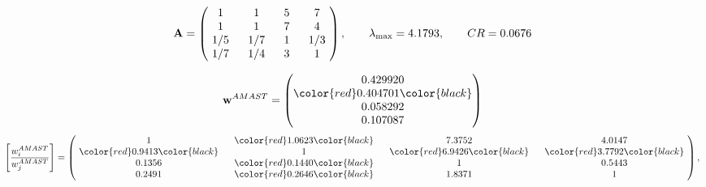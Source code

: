 \begin{example}
\begin{equation*}
\mathbf{A} =
\begin{pmatrix}
$\,\,$ 1 $\,\,$ & $\,\,$1$\,\,$ & $\,\,$5$\,\,$ & $\,\,$7 $\,\,$ \\
$\,\,$ 1 $\,\,$ & $\,\,$ 1 $\,\,$ & $\,\,$7$\,\,$ & $\,\,$4 $\,\,$ \\
$\,\,$ 1/5$\,\,$ & $\,\,$ 1/7$\,\,$ & $\,\,$ 1 $\,\,$ & $\,\,$ 1/3 $\,\,$ \\
$\,\,$ 1/7$\,\,$ & $\,\,$ 1/4$\,\,$ & $\,\,$3$\,\,$ & $\,\,$ 1  $\,\,$ \\
\end{pmatrix},
\qquad
\lambda_{\max} =
4.1793,
\qquad
CR = 0.0676
\end{equation*}

\begin{equation*}
\mathbf{w}^{AMAST} =
\begin{pmatrix}
0.429920\\
\color{red} 0.404701\color{black} \\
0.058292\\
0.107087
\end{pmatrix}\end{equation*}
\begin{equation*}
\left[ \frac{{w}^{AMAST}_i}{{w}^{AMAST}_j} \right] =
\begin{pmatrix}
$\,\,$ 1 $\,\,$ & $\,\,$\color{red} 1.0623\color{black} $\,\,$ & $\,\,$7.3752$\,\,$ & $\,\,$4.0147$\,\,$ \\
$\,\,$\color{red} 0.9413\color{black} $\,\,$ & $\,\,$ 1 $\,\,$ & $\,\,$\color{red} 6.9426\color{black} $\,\,$ & $\,\,$\color{red} 3.7792\color{black}   $\,\,$ \\
$\,\,$0.1356$\,\,$ & $\,\,$\color{red} 0.1440\color{black} $\,\,$ & $\,\,$ 1 $\,\,$ & $\,\,$0.5443 $\,\,$ \\
$\,\,$0.2491$\,\,$ & $\,\,$\color{red} 0.2646\color{black} $\,\,$ & $\,\,$1.8371$\,\,$ & $\,\,$ 1  $\,\,$ \\
\end{pmatrix},
\end{equation*}


\end{example}
